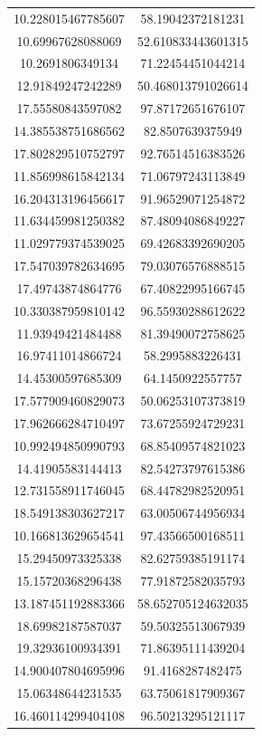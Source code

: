 \begin{table}
\begin{tabular}{cc}
10.228015467785607 & 58.19042372181231 \\
10.69967628088069 & 52.610833443601315 \\
10.2691806349134 & 71.22454451044214 \\
12.91849247242289 & 50.468013791026614 \\
17.55580843597082 & 97.87172651676107 \\
14.385538751686562 & 82.8507639375949 \\
17.802829510752797 & 92.76514516383526 \\
11.856998615842134 & 71.06797243113849 \\
16.204313196456617 & 91.96529071254872 \\
11.634459981250382 & 87.48094086849227 \\
11.029779374539025 & 69.42683392690205 \\
17.547039782634695 & 79.03076576888515 \\
17.49743874864776 & 67.40822995166745 \\
10.330387959810142 & 96.55930288612622 \\
11.93949421484488 & 81.39490072758625 \\
16.97411014866724 & 58.2995883226431 \\
14.45300597685309 & 64.1450922557757 \\
17.577909460829073 & 50.06253107373819 \\
17.962666284710497 & 73.67255924729231 \\
10.992494850990793 & 68.85409574821023 \\
14.41905583144413 & 82.54273797615386 \\
12.731558911746045 & 68.44782982520951 \\
18.549138303627217 & 63.00506744956934 \\
10.166813629654541 & 97.43566500168511 \\
15.29450973325338 & 82.62759385191174 \\
15.15720368296438 & 77.91872582035793 \\
13.187451192883366 & 58.652705124632035 \\
18.69982187587037 & 59.50325513067939 \\
19.32936100934391 & 71.86395111439204 \\
14.900407804695996 & 91.4168287482475 \\
15.06348644231535 & 63.75061817909367 \\
16.460114299404108 & 96.50213295121117 \\

\end{tabular}
\end{table}
